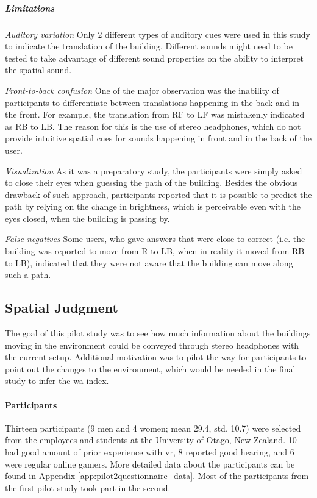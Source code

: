 \subparagraph{Limitations} 
\textit{Auditory variation} Only 2 different types of auditory cues were used in this study to indicate the translation of the building. Different sounds might need to be tested to take advantage of different sound properties on the ability to interpret the spatial sound. 

\textit{Front-to-back confusion} One of the major observation was the inability of participants to differentiate between translations happening in the back and in the front. For example, the translation from RF to LF was mistakenly indicated as RB to LB. The reason for this is the use of stereo headphones, which do not provide intuitive spatial cues for sounds happening in front and in the back of the user.

\textit{Visualization} As it was a preparatory study, the participants were simply asked to close their eyes when guessing the path of the building. Besides the obvious drawback of such approach, participants reported that it is possible to predict the path by relying on the change in brightness, which is perceivable even with the eyes closed, when the building is passing by.

\textit{False negatives} Some users, who gave answers that were close to correct (i.e. the building was reported to move from R to LB, when in reality it moved from RB to LB), indicated that they were not aware that the building can move along such a path.









\subsection{Spatial Judgment}
\label{study_two}
The goal of this pilot study was to see how much information about the buildings moving in the environment could be conveyed through stereo headphones with the current setup. Additional motivation was to pilot the way for participants to point out the changes to the environment, which would be needed in the final study to infer the \gls{wa} index. 

\paragraph{Participants}
Thirteen participants (9 men and 4 women; mean 29.4, std. 10.7) were selected from the employees and students at the University of Otago, New Zealand. 10 had good amount of prior experience with \gls{vr}, 8 reported good hearing, and 6 were regular online gamers. More detailed data about the participants can be found in Appendix \ref{app:pilot2questionnaire_data}. Most of the participants from the first pilot study took part in the second.

